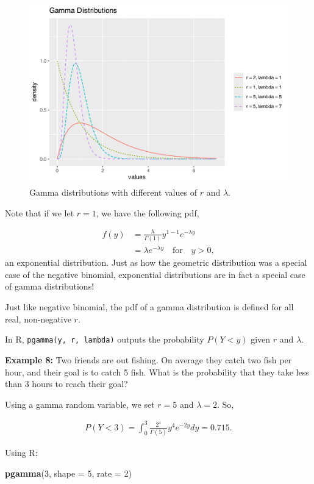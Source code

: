 \documentclass[
]{krantz}
\newenvironment{Shaded}{\begin{snugshade}}{\end{snugshade}}
\newcommand{\AttributeTok}[1]{\textcolor[rgb]{0.27,0.27,0.27}{#1}}
\newcommand{\DecValTok}[1]{\textcolor[rgb]{0.06,0.06,0.06}{#1}}
\newcommand{\FunctionTok}[1]{\textcolor[rgb]{0.27,0.27,0.27}{\textbf{#1}}}
\newcommand{\NormalTok}[1]{#1}
\begin{document}
\begin{figure}

{\centering \includegraphics[width=0.6\linewidth]{bookdown-BeyondMLR_files/figure-latex/multGamma-1} 

}

\caption{Gamma distributions with different values of \(r\) and \(\lambda\).}\label{fig:multGamma}
\end{figure}

Note that if we let \(r = 1\), we have the following pdf,

\begin{align*}
 f(y) &= \frac{\lambda}{\Gamma(1)} y^{1-1} e^{-\lambda y} \\
      &= \lambda e^{-\lambda y} \quad \textrm{for} \quad y > 0,
\end{align*}
an exponential distribution. Just as how the geometric distribution was a special case of the negative binomial, exponential distributions are in fact a special case of gamma distributions!

Just like negative binomial, the pdf of a gamma distribution is defined for all real, non-negative \(r\).

In R, \texttt{pgamma(y,\ r,\ lambda)} outputs the probability \(P(Y < y)\) given \(r\) and \(\lambda\).

\textbf{Example 8:} Two friends are out fishing. On average they catch two fish per hour, and their goal is to catch 5 fish. What is the probability that they take less than 3 hours to reach their goal?

Using a gamma random variable, we set \(r = 5\) and \(\lambda = 2\). So,

\begin{align*}
P(Y < 3) = \int_0^3 \frac{2^4}{\Gamma(5)} y^{4} e^{-2y}dy = 0.715.
\end{align*}

Using R:

\begin{Shaded}
\begin{Highlighting}[]
\FunctionTok{pgamma}\NormalTok{(}\DecValTok{3}\NormalTok{, }\AttributeTok{shape =} \DecValTok{5}\NormalTok{, }\AttributeTok{rate =} \DecValTok{2}\NormalTok{)}
\end{Highlighting}
\end{Shaded}
\end{document}
